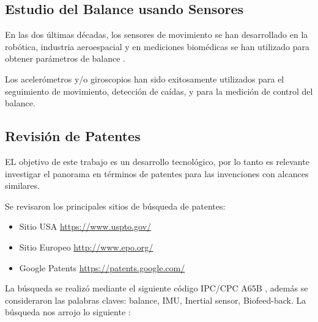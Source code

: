 \documentclass[12pt,a4paper]{article}
\begin{document}
\subsection{Estudio del Balance usando Sensores}
En las dos últimas décadas, los sensores de movimiento se han desarrollado en la robótica, industria aeroespacial y en mediciones biomédicas se han utilizado para obtener parámetros de balance \cite{mancini_relevance_2010}.

Los acelerómetros y/o giroscopios han sido exitosamente utilizados \cite{mancini_relevance_2010} para el seguimiento de movimiento,  detección de caídas, y para la medición de control del balance.

\newpage
\subsection{Revisión de Patentes}
EL objetivo de este trabajo es un desarrollo tecnológico, por lo tanto es relevante investigar el panorama en términos de patentes para las invenciones con alcances similares.

Se revisaron los principales sitios de búsqueda de patentes:
\begin{itemize}
	\item Sitio USA \url{https://www.uspto.gov/}
	\item Sitio Europeo \url{http://www.epo.org/}
	\item Google Patents  \url{https://patents.google.com/}
\end{itemize}
La búsqueda se realizó mediante el siguiente código IPC/CPC  A65B \cite{patentes}, además se consideraron las palabras claves: balance, IMU, Inertial sensor, Biofeed-back. 
La búsqueda nos arrojo lo siguiente : 
\end{document}
